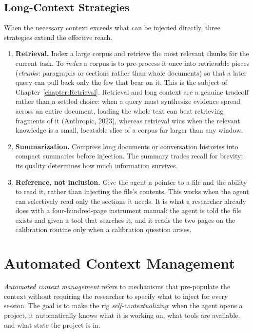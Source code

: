 \subsection{Long-Context Strategies}

When the necessary context exceeds what can be injected directly, three strategies extend the effective reach.

\begin{enumerate}
\item \textbf{Retrieval.} Index a large corpus and retrieve the most relevant chunks for the current task.
To \emph{index} a corpus is to pre-process it once into retrievable pieces (\emph{chunks}: paragraphs or sections rather than whole documents) so that a later query can pull back only the few that bear on it.
This is the subject of Chapter~\ref{chapter:Retrieval}.
Retrieval and long context are a genuine tradeoff rather than a settled choice: when a query must synthesize evidence spread across an entire document, loading the whole text can beat retrieving fragments of it (Anthropic, 2023), whereas retrieval wins when the relevant knowledge is a small, locatable slice of a corpus far larger than any window.

\item \textbf{Summarization.} Compress long documents or conversation histories into compact summaries before injection.
The summary trades recall for brevity; its quality determines how much information survives.

\item \textbf{Reference, not inclusion.} Give the agent a pointer to a file and the ability to read it, rather than injecting the file's contents.
This works when the agent can selectively read only the sections it needs.
It is what a researcher already does with a four-hundred-page instrument manual: the agent is told the file exists and given a tool that searches it, and it reads the two pages on the calibration routine only when a calibration question arises.
\end{enumerate}

\section{Automated Context Management}
\label{section:AutomatedContext}

\emph{Automated context management} refers to mechanisms that pre-populate the context without requiring the researcher to specify what to inject for every session.
The goal is to make the rig \emph{self-contextualizing}: when the agent opens a project, it automatically knows what it is working on, what tools are available, and what state the project is in.

